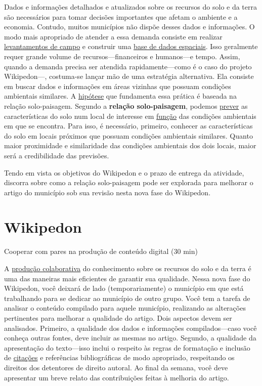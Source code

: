 \documentclass[
  11pt,
  a4paper,
  dvipsnames]{tufte-book}
\begin{document}
Dados e informações detalhados e atualizados sobre os recursos do solo e da terra são necessários para tomar decisões importantes que afetam o ambiente e a economia. Contudo, muitos municípios não dispõe desses dados e informações. O modo mais apropriado de atender a essa demanda consiste em realizar \href{https://www.cpt.com.br/cursos-administracaorural/artigos/levantamento-de-recursos-naturais-como-e-por-que-fazer}{levantamentos de campo} e construir uma \href{https://pt.wikipedia.org/wiki/Banco_de_dados_espaciais}{base de dados espaciais}. Isso geralmente requer grande volume de recursos---financeiros e humanos---e tempo. Assim, quando a demanda precisa ser atendida rapidamente---como é o caso do projeto Wikipedon---, costuma-se lançar mão de uma estratégia alternativa. Ela consiste em buscar dados e informações em áreas vizinhas que possuam condições ambientais similares. A \href{https://pt.wikipedia.org/wiki/Hip\%C3\%B3tese}{hipótese} que fundamenta essa prática é baseada na relação solo-paisagem. Segundo a \textbf{relação solo-paisagem}, podemos \href{https://pt.wikipedia.org/wiki/Previs\%C3\%A3o_do_tempo}{prever} as características do solo num local de interesse em \href{https://pt.wikipedia.org/wiki/Fun\%C3\%A7\%C3\%A3o_(matem\%C3\%A1tica)}{função} das condições ambientais em que se encontra. Para isso, é necessário, primeiro, conhecer as características do solo em locais próximos que possuam condições ambientais similares. Quanto maior proximidade e similaridade das condições ambientais dos dois locais, maior será a credibilidade das previsões.

Tendo em vista os objetivos do Wikipedon e o prazo de entrega da atividade, discorra sobre como a relação solo-paisagem pode ser explorada para melhorar o artigo do município sob sua revisão nesta nova fase do Wikipedon.

\hypertarget{wikipedon-6}{%
\section{Wikipedon}\label{wikipedon-6}}

Cooperar com pares na produção de conteúdo digital (30 min)

A \href{https://pt.wikipedia.org/wiki/Produ\%C3\%A7\%C3\%A3o_colaborativa}{produção colaborativa} do conhecimento sobre os recursos do solo e da terra é uma das maneiras mais eficientes de garantir sua qualidade. Nessa nova fase do Wikipedon, você deixará de lado (temporariamente) o município em que está trabalhando para se dedicar ao município de outro grupo. Você tem a tarefa de analisar o conteúdo compilado para aquele município, realizando as alterações pertinentes para melhorar a qualidade do artigo. Dois aspectos devem ser analisados. Primeiro, a qualidade dos dados e informações compilados---caso você conheça outras fontes, deve incluir as mesmas no artigo. Segundo, a qualidade da apresentação do texto---isso inclui o respeito às regras de formatação e inclusão de \href{https://pt.wikipedia.org/wiki/Wikip\%C3\%A9dia:Livro_de_estilo/Cite_as_fontes}{citações} e referências bibliográficas de modo apropriado, respeitando os direitos dos detentores de direito autoral. Ao final da semana, você deve apresentar um breve relato das contribuições feitas à melhoria do artigo.
\end{document}
